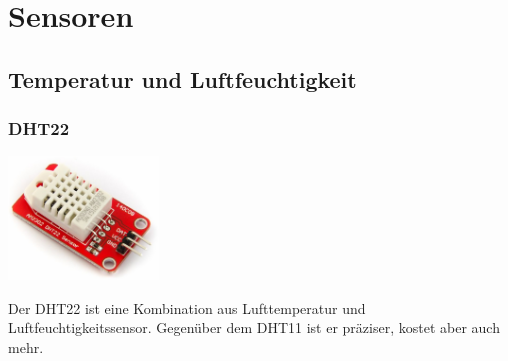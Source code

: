 \documentclass[
  12pt, %
  a4paper, %
  twoside, %
  openany, %
  numbers=noenddot, %
  BCOR=5mm, %
  parskip=half*, %
  thesis, %
]{bfhbook}
\newcommand{\compImgSize}{4cm}
\begin{document}
 \section{Sensoren}
 \subsection{Temperatur und Luftfeuchtigkeit}
 \subsubsection{DHT22}\label{DHT22}
\begin{minipage}[t]{0.5\linewidth}
		\centering
    		\includegraphics[width=\compImgSize, left, valign=t]{Bilder/DHT22.jpg}
	\end{minipage}
	\begin{minipage}[t]{0.5\linewidth}
	Der DHT22 \footnotemark ist eine Kombination aus Lufttemperatur und Luftfeuchtigkeitssensor. Gegenüber dem DHT11 ist er präziser, kostet aber auch mehr.
\end{minipage}
\end{document}
